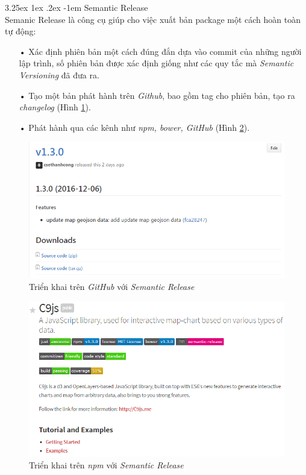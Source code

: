 \documentclass[12pt,a4paper,twoside]{article}
\makeatletter
\newcommand{\myparagraph}[1]{\paragraph{#1}\mbox{}\\} %
\renewcommand\paragraph{\@startsection{paragraph}{5}{\z@}%
  {3.25ex \@plus1ex \@minus.2ex}%
  {-1em}%
  {\normalfont\normalsize\bfseries}}
\makeatother
\begin{document}
\myparagraph{Semantic Release}
Semanic Release là công cụ giúp cho việc xuất bản package một cách hoàn toàn tự động:
\begin{itemize}
\item[•] Xác định phiên bản một cách đúng đắn dựa vào commit của những người lập trình, số phiên bản được xác định giống như các quy tắc mà \textit{Semantic Versioning} đã đưa ra.
\item[•] Tạo một bản phát hành trên \textit{Github}, bao gồm tag cho phiên bản, tạo ra \textit{changelog} (Hình \ref{fig:semantic_1}).
\item[•] Phát hành qua các kênh như \textit{npm, bower, GitHub} (Hình \ref{fig:semantic_2}).
\end{itemize}

\begin{figure}[!h]
	\begin{center}
    \includegraphics[scale=.8]{image/semantic_1}
    \caption{Triển khai trên \textit{GitHub} với \textit{Semantic Release}}
    \label{fig:semantic_1}
	\end{center}
\end{figure}

\begin{figure}[!h]
	\begin{center}
    \includegraphics[scale=.8]{image/semantic_2}
    \caption{Triển khai trên \textit{npm} với \textit{Semantic Release}}
    \label{fig:semantic_2}
	\end{center}
\end{figure}
\end{document}
